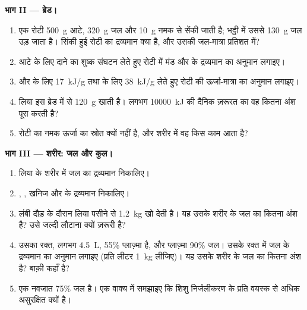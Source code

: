 \begin{problem}[{सप्ताहांत समस्या --- गेहूँ के खेत से एक शरीर तक: पदार्थ
का लेखा-जोखा, दाने के जल से लेकर इस सवाल तक कि कोई व्यक्ति कितने
किलोग्राम कार्बन ढोता है}]
\medskip
\noindent\textbf{भाग II --- ब्रेड।}
\begin{enumerate}[resume]
  \item एक रोटी \qty{500}{g} आटे, \qty{320}{g} जल और \qty{10}{g} नमक से
        सेंकी जाती है; भट्ठी में उससे \qty{130}{g} जल उड़ जाता है। सिंकी
        हुई रोटी का द्रव्यमान क्या है, और उसकी जल-मात्रा प्रतिशत में?
  \item आटे के लिए दाने का शुष्क संघटन लेते हुए रोटी में मंड और 
        के द्रव्यमान का अनुमान लगाइए।
  \item {} और  के लिए \qty{17}{kJ/g} तथा  के लिए
        \qty{38}{kJ/g} लेते हुए रोटी की ऊर्जा-मात्रा का अनुमान लगाइए।
  \item लिया इस ब्रेड में से \qty{120}{g} खाती है। लगभग \qty{10000}{kJ}
        की दैनिक ज़रूरत का वह कितना अंश पूरा करती है?
  \item रोटी का नमक ऊर्जा का स्रोत क्यों नहीं है, और शरीर में वह किस काम
        आता है?
\end{enumerate}

\medskip
\noindent\textbf{भाग III --- शरीर: जल और कुल।}
\begin{enumerate}[resume]
  \item लिया के शरीर में जल का द्रव्यमान निकालिए।
  \item {}, , खनिज और  के द्रव्यमान निकालिए।
  \item लंबी दौड़ के दौरान लिया पसीने से \qty{1.2}{kg} खो देती है। यह
        उसके शरीर के जल का कितना अंश है? उसे जल्दी लौटाना क्यों ज़रूरी
        है?
  \item उसका रक्त, लगभग \qty{4.5}{L}, 55\% प्लाज़्मा है, और प्लाज़्मा
        90\% जल। उसके रक्त में जल के द्रव्यमान का अनुमान लगाइए (प्रति
        लीटर \qty{1}{kg} लीजिए)। यह उसके शरीर के जल का कितना अंश है?
        बाक़ी कहाँ है?
  \item एक नवजात 75\% जल है। एक वाक्य में समझाइए कि शिशु निर्जलीकरण के
        प्रति वयस्क से अधिक असुरक्षित क्यों है।
\end{enumerate}


\end{problem}

